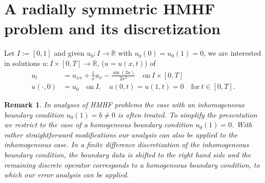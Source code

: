 \documentclass{siamltex}
\newcommand{\R}{\mathbb{R}}
\newtheorem{remark}{Remark}[section]
\begin{document}
%
%
\section{A radially symmetric HMHF problem and its discretization} \label{sectdiscrete}
Let $I:=[0,1]$ and given $u_0: I \to \R$ with $u_0(0)=u_0(1)=0$, we are interested in solutions $u: I \times [0,T] \to \R$,  ($u=u(x,t)$) of 
 \begin{equation} \label{PDE} \begin{split}
  u_t & = u_{xx} + \frac{1}{x}u_x - \frac{\sin(2u)}{2 x^2} \quad \text{on}~ I \times [0,T]  \\
   u(\cdot, 0) & = u_0 \quad \text{on}~I, \quad u(0,t)=u(1,t)=0 \quad \text{for}~t \in [0,T].
  \end{split} \end{equation}
  \begin{remark} \rm
   In analyses of HMHF problems the  case with an \emph{in}homogeneous boundary condition $u_0(1)=b \neq 0$ is often treated. To simplify the presentation we restrict to the case of a homogeneous boundary condition $u_0(1)=0$. With rather straightforward modifications our analysis can also be applied to the inhomogeneous case. In a finite difference discretization of the inhomogeneous boundary condition, the boundary data is shifted to the right hand side and the remaining discrete operator corresponds to a homogeneous boundary condition, to which our error analysis can be applied.  
  \end{remark}
  
\end{document}
